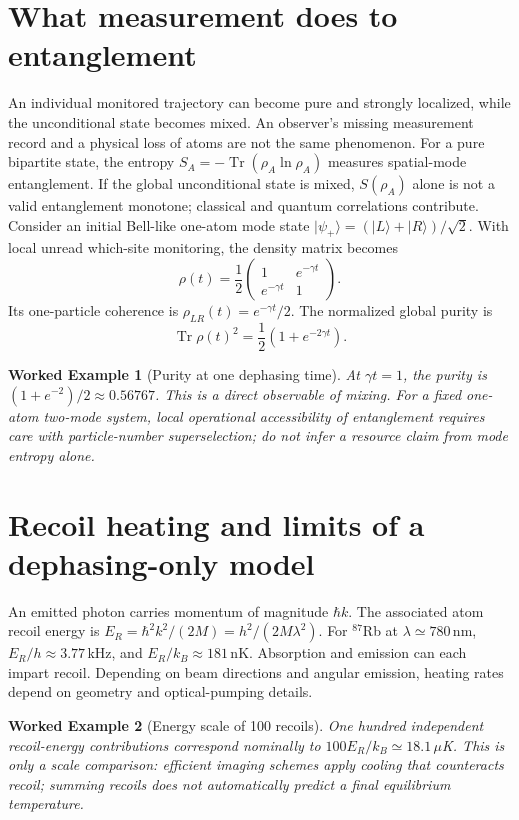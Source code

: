 \documentclass[11pt,a4paper]{article}
\newtheorem{example}{Worked Example}\newtheorem{remark}{Physical qualification}
\newcommand{\tr}{\operatorname{Tr}}\newcommand{\D}{\mathcal D}\newcommand{\kb}{k_{\mathrm B}}\newcommand{\E}{\mathbb E}\newcommand{\Ha}{\mathcal H}\newcommand{\ket}[1]{|#1\rangle}\newcommand{\bra}[1]{\langle#1|}
\begin{document}
\section{What measurement does to entanglement}
An individual monitored trajectory can become pure and strongly localized, while the unconditional state becomes mixed. An observer's missing measurement record and a physical loss of atoms are not the same phenomenon. For a pure bipartite state, the entropy $S_A=-\tr(\rho_A\ln\rho_A)$ measures spatial-mode entanglement. If the global unconditional state is mixed, $S(\rho_A)$ alone is not a valid entanglement monotone; classical and quantum correlations contribute.
Consider an initial Bell-like one-atom mode state $\ket{\psi_+}=(\ket L+\ket R)/\sqrt2$. With local unread which-site monitoring, the density matrix becomes
\begin{equation}
\rho(t)=\frac12\begin{pmatrix}1&e^{-\gamma t}\\e^{-\gamma t}&1\end{pmatrix}.
\end{equation}
Its one-particle coherence is $\rho_{LR}(t)=e^{-\gamma t}/2$. The normalized global purity is
\begin{equation}\tr\rho(t)^2=\frac12(1+e^{-2\gamma t}).\end{equation}
\begin{example}[Purity at one dephasing time]
At $\gamma t=1$, the purity is $(1+e^{-2})/2\approx0.56767$. This is a direct observable of mixing. For a fixed one-atom two-mode system, local operational accessibility of entanglement requires care with particle-number superselection; do not infer a resource claim from mode entropy alone.
\end{example}
\section{Recoil heating and limits of a dephasing-only model}
An emitted photon carries momentum of magnitude $\hbar k$. The associated atom recoil energy is $E_R=\hbar^2k^2/(2M)=h^2/(2M\lambda^2)$. For $^{87}$Rb at $\lambda\simeq780\,$nm, $E_R/h\approx3.77\,$kHz, and $E_R/k_B\approx181\,$nK. Absorption and emission can each impart recoil. Depending on beam directions and angular emission, heating rates depend on geometry and optical-pumping details.
\begin{example}[Energy scale of 100 recoils]
One hundred independent recoil-energy contributions correspond nominally to $100E_R/k_B\simeq18.1\,\mu$K. This is only a scale comparison: efficient imaging schemes apply cooling that counteracts recoil; summing recoils does not automatically predict a final equilibrium temperature.
\end{example}
\end{document}
